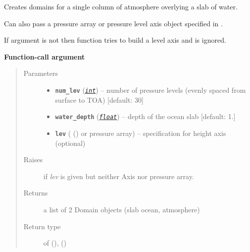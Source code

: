\documentclass[a4paper,10pt,english]{sphinxmanual}
\begin{document}

\begin{fulllineitems}
\label{api/climlab.domain:climlab.domain.domain.single_column}
Creates domains for a single column of atmosphere overlying a slab of water.

Can also pass a pressure array or pressure level axis object specified in .

If argument  is not  then function tries to build a level axis
and  is ignored.

\textbf{Function-call argument}
\begin{quote}\begin{description}
\item[{Parameters}] \leavevmode\begin{itemize}
\item {} 
\textbf{\texttt{num\_lev}} (\href{http://docs.python.org/2.7/library/functions.html\#int}{\emph{\texttt{int}}}) -- number of pressure levels
(evenly spaced from surface to TOA) {[}default: 30{]}

\item {} 
\textbf{\texttt{water\_depth}} (\href{http://docs.python.org/2.7/library/functions.html\#float}{\emph{\texttt{float}}}) -- depth of the ocean slab {[}default: 1.{]}

\item {} 
\textbf{\texttt{lev}} ({\hyperref[api/climlab.domain:climlab.domain.axis.Axis]{\emph{}}} () or pressure array) -- specification for height axis (optional)

\end{itemize}

\item[{Raises}] \leavevmode
{}  if \emph{lev} is given but neither Axis 
nor pressure array.

\item[{Returns}] \leavevmode
a list of 2 Domain objects (slab ocean, atmosphere)

\item[{Return type}] \leavevmode
\href{http://docs.python.org/2.7/library/functions.html\#list}{} of {\hyperref[api/climlab.domain:climlab.domain.domain.SlabOcean]{\emph{}}} (), {\hyperref[api/climlab.domain:climlab.domain.domain.SlabAtmosphere]{\emph{}}} ()


\end{description}
\end{quote}
\end{fulllineitems}
\end{document}
